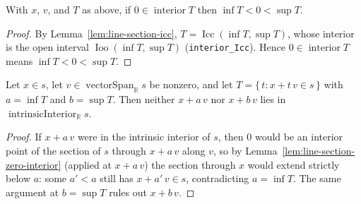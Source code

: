 \begin{lemma}
    \label{lem:line-section-zero-interior}
    \leanok
    With $x$, $v$, and $T$ as above, if $0 \in \operatorname{interior} T$ then
    $\inf T < 0 < \sup T$.
\end{lemma}
\begin{proof}
    By Lemma~\ref{lem:line-section-icc}, $T = \operatorname{Icc}(\inf T, \sup T)$,
    whose interior is the open interval $\operatorname{Ioo}(\inf T, \sup T)$
    (\texttt{interior\_Icc}). Hence $0 \in \operatorname{interior} T$ means
    $\inf T < 0 < \sup T$.
\end{proof}

\begin{lemma}
    \label{lem:segment-endpoints-not-interior}
    \leanok
    Let $x \in s$, let $v \in \operatorname{vectorSpan}_{\mathbb R} s$ be nonzero,
    and let $T = \{\, t : x + t\, v \in s \,\}$ with $a = \inf T$ and $b = \sup T$.
    Then neither $x + a\, v$ nor $x + b\, v$ lies in
    $\operatorname{intrinsicInterior}_{\mathbb R} s$.
\end{lemma}
\begin{proof}
    If $x + a\, v$ were in the intrinsic interior of $s$, then $0$ would be an
    interior point of the section of $s$ through $x + a\, v$ along $v$, so by
    Lemma~\ref{lem:line-section-zero-interior} (applied at $x + a\, v$) the section
    through $x$ would extend strictly below $a$: some $a' < a$ still has
    $x + a'\, v \in s$, contradicting $a = \inf T$. The same argument at
    $b = \sup T$ rules out $x + b\, v$.
\end{proof}

